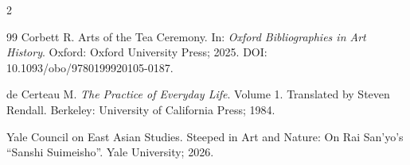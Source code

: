 \documentclass[numbers]{IntechOpen-Book}
\begin{document}
\begin{backmatter}
\begin{multicols}{2}
\begin{thebibliography}{99}
 Corbett R. Arts of the Tea Ceremony. In: \textit{Oxford Bibliographies in Art History}. Oxford: Oxford University Press; 2025. DOI: 10.1093/obo/9780199920105-0187.

 de Certeau M. \textit{The Practice of Everyday Life}. Volume 1. Translated by Steven Rendall. Berkeley: University of California Press; 1984.

 Yale Council on East Asian Studies. Steeped in Art and Nature: On Rai San'yo's ``Sanshi Suimeisho''. Yale University; 2026.

\end{thebibliography}
\end{multicols}
\end{backmatter}
\end{document}
